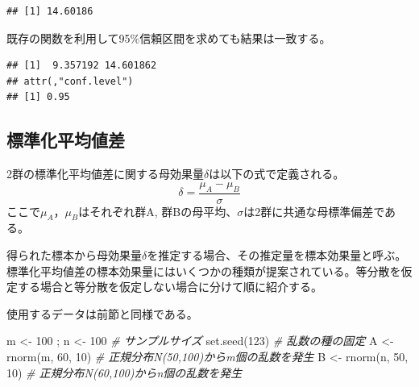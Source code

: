 \documentclass[
  ja=standard, xelatex, base=12pt]{bxjsreport}
\newenvironment{Shaded}{\begin{snugshade}}{\end{snugshade}}
\newcommand{\AttributeTok}[1]{\textcolor[rgb]{0.77,0.63,0.00}{#1}}
\newcommand{\CommentTok}[1]{\textcolor[rgb]{0.56,0.35,0.01}{\textit{#1}}}
\newcommand{\DecValTok}[1]{\textcolor[rgb]{0.00,0.00,0.81}{#1}}
\newcommand{\FunctionTok}[1]{\textcolor[rgb]{0.00,0.00,0.00}{#1}}
\newcommand{\NormalTok}[1]{#1}
\newcommand{\OtherTok}[1]{\textcolor[rgb]{0.56,0.35,0.01}{#1}}
\newcommand{\SpecialCharTok}[1]{\textcolor[rgb]{0.00,0.00,0.00}{#1}}
\begin{document}
\begin{verbatim}
## [1] 14.60186
\end{verbatim}

既存の関数を利用して95\%信頼区間を求めても結果は一致する。

\begin{Shaded}
\end{Shaded}

\begin{verbatim}
## [1]  9.357192 14.601862
## attr(,"conf.level")
## [1] 0.95
\end{verbatim}

\hypertarget{ux6a19ux6e96ux5316ux5e73ux5747ux5024ux5dee}{%
\subsection{標準化平均値差}\label{ux6a19ux6e96ux5316ux5e73ux5747ux5024ux5dee}}

2群の標準化平均値差に関する母効果量\(\delta\)は以下の式で定義される。 \[
\delta=\frac{μ_A-μ_B}{σ}
\]ここで\(μ_A\)，\(μ_B\)はそれぞれ群A, 群Bの母平均、\(σ\)は2群に共通な母標準偏差である。

得られた標本から母効果量\(\delta\)を推定する場合、その推定量を標本効果量と呼ぶ。 標準化平均値差の標本効果量にはいくつかの種類が提案されている。等分散を仮定する場合と等分散を仮定しない場合に分けて順に紹介する。

使用するデータは前節と同様である。

\begin{Shaded}
\begin{Highlighting}[]
\NormalTok{m }\OtherTok{\textless{}{-}} \DecValTok{100}\NormalTok{ ; n }\OtherTok{\textless{}{-}} \DecValTok{100}   \CommentTok{\# サンプルサイズ}
\FunctionTok{set.seed}\NormalTok{(}\DecValTok{123}\NormalTok{)         }\CommentTok{\# 乱数の種の固定}
\NormalTok{A }\OtherTok{\textless{}{-}} \FunctionTok{rnorm}\NormalTok{(m, }\DecValTok{60}\NormalTok{, }\DecValTok{10}\NormalTok{) }\CommentTok{\# 正規分布N(50,100)からm個の乱数を発生}
\NormalTok{B }\OtherTok{\textless{}{-}} \FunctionTok{rnorm}\NormalTok{(n, }\DecValTok{50}\NormalTok{, }\DecValTok{10}\NormalTok{) }\CommentTok{\# 正規分布N(60,100)からn個の乱数を発生}
\end{Highlighting}
\end{Shaded}
\end{document}
